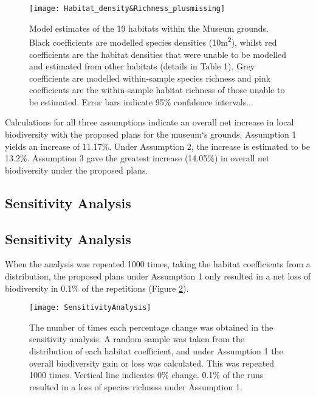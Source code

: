 \begin{figure}[t]
	\centering
	\texttt{[image: Habitat\_density\&Richness\_plusmissing]}
	\caption{Model estimates of the 19 habitats within the Museum grounds. Black coefficients are modelled species densities (10m\textsuperscript{2}), whilst red coefficients are the habitat densities that were unable to be modelled and estimated from other habitats (details in Table 1). Grey coefficients are modelled within-sample species richness and pink coefficients are the within-sample habitat richness of those unable to be estimated. Error bars indicate 95\% confidence intervals..}
   	 \label{fig:wlgmodel}
\end{figure}
	
Calculations for all three assumptions indicate an overall net increase in local biodiversity with the proposed plans for the museum`s grounds. Assumption 1 yields an increase of 11.17\%. Under Assumption 2, the increase is estimated to be 13.2\%. Assumption 3 gave the greatest increase (14.05\%) in overall net biodiversity under the proposed plans.

\ifappendixStyle %
\subsection{Sensitivity Analysis}%
\else
\subsection*{Sensitivity Analysis}
\fi

When the analysis was repeated 1000 times, taking the habitat coefficients from a distribution, the proposed plans under Assumption 1 only resulted in a net loss of biodiversity in 0.1\% of the repetitions (Figure \ref{fig:wlgsensitivity}).

\begin{figure}[t]
	\centering
	\texttt{[image: SensitivityAnalysis]}
	\caption{The number of times each percentage change was obtained in the sensitivity analysis.  A random sample was taken from the distribution of each habitat coefficient, and under Assumption 1 the overall biodiversity gain or loss was calculated. This was repeated 1000 times. Vertical line indicates 0\% change. 0.1\% of the runs resulted in a loss of species richness under Assumption 1.}
   	 \label{fig:wlgsensitivity}
\end{figure}

\ifappendixStyle %
